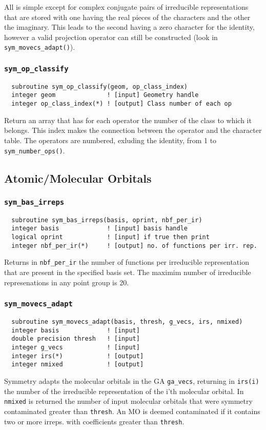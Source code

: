 All is simple except for complex conjugate pairs of irreducible
representations that are stored with one having the real pieces of the
characters and the other the imaginary.  This leads to the second
having a zero character for the identity, however a valid projection
operator can still be constructed (look in \verb+sym_movecs_adapt()+).

\subsubsection{{\tt sym\_op\_classify}}
\begin{verbatim}
  subroutine sym_op_classify(geom, op_class_index)
  integer geom              ! [input] Geometry handle
  integer op_class_index(*) ! [output] Class number of each op
\end{verbatim}
Return an array that has for each operator the number of the class to
which it belongs.  This index makes the connection between the
operator and the character table.  The operators are numbered,
exluding the identity, from 1 to \verb+sym_number_ops()+.

\subsection{Atomic/Molecular Orbitals}

\subsubsection{{\tt sym\_bas\_irreps}}
\begin{verbatim}
  subroutine sym_bas_irreps(basis, oprint, nbf_per_ir)
  integer basis             ! [input] basis handle
  logical oprint            ! [input] if true then print
  integer nbf_per_ir(*)     ! [output] no. of functions per irr. rep.
\end{verbatim}
Returns in \verb+nbf_per_ir+ the number of functions per irreducible
representation that are present in the specified basis set.  The
maximim number of irreducible represenations in any point group is 20.

\subsubsection{{\tt sym\_movecs\_adapt}}
\begin{verbatim}
  subroutine sym_movecs_adapt(basis, thresh, g_vecs, irs, nmixed)
  integer basis             ! [input]
  double precision thresh   ! [input]
  integer g_vecs            ! [input]
  integer irs(*)            ! [output]
  integer nmixed            ! [output]
\end{verbatim}
Symmetry adapts the molecular orbitals in the GA \verb+ga_vecs+,
returning in \verb+irs(i)+ the number of the irreducible
representation of the i'th molecular orbital.  In \verb+nmixed+ is
returned the number of input molecular orbitals that were symmetry
contaminated greater than \verb+thresh+.  An MO is deemed contaminated
if it contains two or more irreps. with coefficients greater than
\verb+thresh+.

